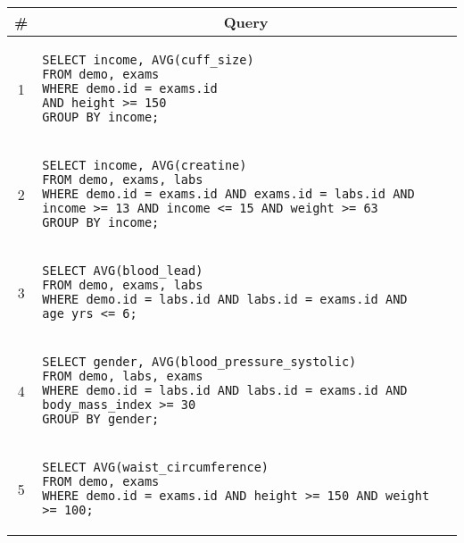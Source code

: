 \begin{tabular}{cl}
\toprule
\# & \multicolumn{1}{c}{Query} \\
\midrule
1 & 
\begin{minipage}{6in}
\begin{lstlisting}[breaklines]
SELECT income, AVG(cuff_size)
FROM demo, exams
WHERE demo.id = exams.id
AND height >= 150
GROUP BY income;
\end{lstlisting}
\end{minipage}{queryno}\label[query]{q1} \\
2 & 
\begin{minipage}{6in}
\begin{lstlisting}[breaklines]
SELECT income, AVG(creatine)
FROM demo, exams, labs
WHERE demo.id = exams.id AND exams.id = labs.id AND income >= 13 AND income <= 15 AND weight >= 63
GROUP BY income;
\end{lstlisting}
\end{minipage}
{queryno}\label[query]{q2} \\
3 & 
\begin{minipage}{6in}
\begin{lstlisting}[breaklines]
SELECT AVG(blood_lead)
FROM demo, exams, labs
WHERE demo.id = labs.id AND labs.id = exams.id AND age_yrs <= 6;
\end{lstlisting}
\end{minipage}{queryno}\label[query]{q3}\\
4 & 
\begin{minipage}{6in}
\begin{lstlisting}[breaklines]
SELECT gender, AVG(blood_pressure_systolic)
FROM demo, labs, exams
WHERE demo.id = labs.id AND labs.id = exams.id AND body_mass_index >= 30
GROUP BY gender;
\end{lstlisting}
\end{minipage}{queryno}\label[query]{q4}\\
5 & 
\begin{minipage}{6in}
\begin{lstlisting}[breaklines]
SELECT AVG(waist_circumference)
FROM demo, exams
WHERE demo.id = exams.id AND height >= 150 AND weight >= 100;
\end{lstlisting}
\end{minipage}{queryno}\label[query]{q5}\\
\bottomrule
\end{tabular}

